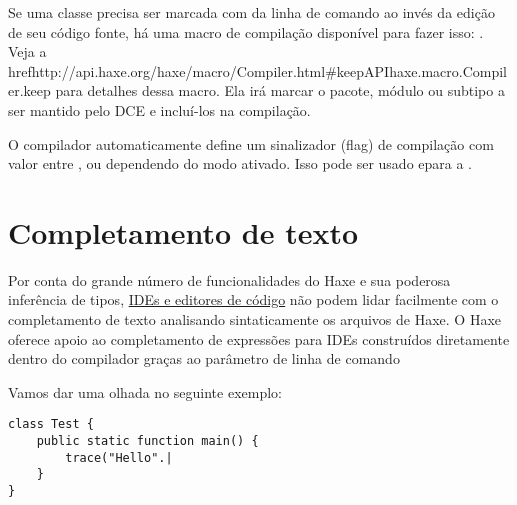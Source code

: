 Se uma classe precisa ser marcada com  da linha de comando ao invés da edição de seu código fonte, há uma macro de compilação disponível para fazer isso: . Veja a href{http://api.haxe.org/haxe/macro/Compiler.html#keep}{APIhaxe.macro.Compiler.keep} para detalhes dessa macro. Ela irá marcar o pacote, módulo ou subtipo a ser mantido pelo DCE e incluí-los na compilação.

O compilador automaticamente define um sinalizador (flag) de compilação  com valor entre ,  ou  dependendo do modo ativado. Isso pode ser usado epara a .



\section{Completamento de texto}
\label{cr-completion}

Por conta do grande número de funcionalidades do Haxe e sua poderosa inferência de tipos, \href{http://haxe.org/documentation/introduction/editors-and-ides.html}{IDEs e editores de código} não podem lidar facilmente com o completamento de texto analisando sintaticamente os arquivos de Haxe. O Haxe oferece apoio ao completamento de expressões para IDEs construídos diretamente dentro do compilador graças ao parâmetro de linha de comando 

Vamos dar uma olhada no seguinte exemplo:
\begin{lstlisting}
class Test {
    public static function main() {
        trace("Hello".|
    }
}
\end{lstlisting}

